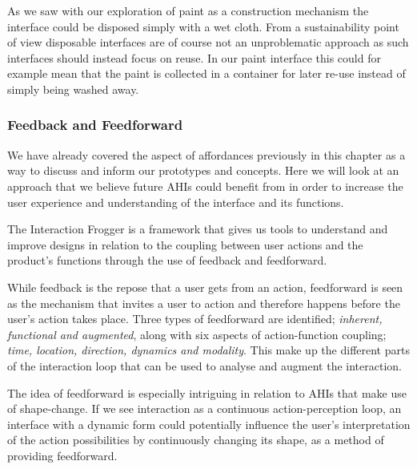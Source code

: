 As we saw with our exploration of paint as a construction mechanism the interface could be disposed simply with a wet cloth.
From a sustainability point of view disposable interfaces are of course not an unproblematic approach as such interfaces should instead focus on reuse.
In our paint interface this could for example mean that the paint is collected in a container for later re-use instead of simply being washed away. 

\subsubsection{Feedback and Feedforward}
We have already covered the aspect of affordances previously in this chapter as a way to discuss and inform our prototypes and concepts.
Here we will look at an approach that we believe future AHIs could benefit from in order to increase the user experience and understanding of the interface and its functions.

The Interaction Frogger is a framework \citep{stienstra2012design,wensveen2004interaction} that gives us tools to understand and improve designs in relation to the coupling between user actions and the product's functions through the use of feedback and feedforward.

While feedback is the repose that a user gets from an action, feedforward is seen as the mechanism that invites a user to action and therefore happens before the user's action takes place. 
Three types of feedforward are identified; \emph{inherent, functional and augmented}, along with six aspects of action-function coupling; \emph{time, location, direction, dynamics and modality}.
This make up the different parts of the interaction loop that can be used to analyse and augment the interaction.

The idea of feedforward is especially intriguing in relation to AHIs that make use of shape-change.
If we see interaction as a continuous action-perception loop, an interface with a dynamic form could potentially influence the user's interpretation of the action possibilities by continuously changing its shape, as a method of providing feedforward.

